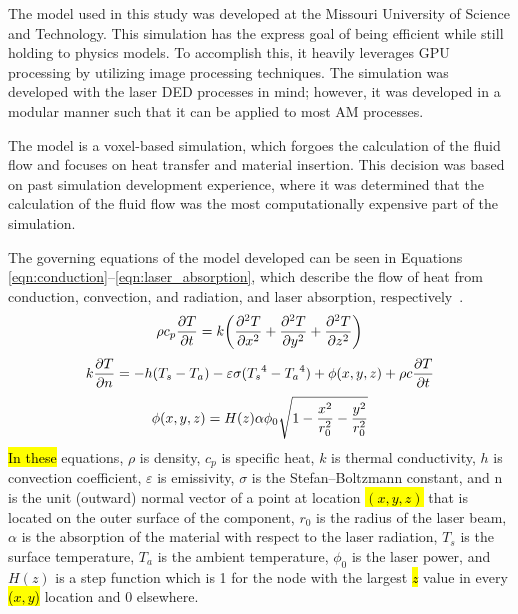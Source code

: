 \documentclass[metals,article,accept,pdftex,moreauthors]{Definitions/mdpi}
\begin{document}
The model used in this study was developed at the Missouri University of Science and 
Technology.
This simulation has the express goal of being efficient while still holding to physics 
models.  To accomplish this, it heavily leverages GPU processing by utilizing image 
processing techniques.  The simulation was developed with the laser \ac{DED} processes 
in mind; however, it was developed in a modular manner such that it can be applied to 
most \ac{AM} processes. 

The model is a voxel-based simulation, which forgoes the calculation of the fluid flow and focuses on heat transfer and material insertion.  This decision was based on past simulation development experience, where it was determined that the calculation of the fluid flow was the most computationally expensive part of the simulation.   

The governing equations of the model developed can be seen in Equations 
\eqref{eqn:conduction}--\eqref{eqn:laser_absorption}, which describe the flow of heat 
from conduction, convection, and radiation, and laser absorption, 
respectively~\cite{Han2012}.
\begin{equation}
\label{eqn:conduction}
\centering
\rho c_p \frac{\partial T}{\partial t}=k \left(\frac{\partial^2 T}{\partial x^2} +\frac{\partial^2 T}{\partial y^2}+\frac{\partial^2 T}{\partial z^2} \right)
\end{equation}
	\begin{equation}
	\label{eqn:conv-rad}
	\centering
	k \frac{\partial T}{\partial n}=-h (T_s-T_a) - \varepsilon \sigma ({T_s}^4-{T_a}^4) + \phi(x, y, z) + \rho c \frac{\partial T}{\partial t}
	\end{equation}
		\begin{equation}
		\label{eqn:laser_absorption}
		\centering
		\phi(x,y,z) = H(z) \alpha \phi_0 \sqrt{1-\frac{x^2}{r_0^2} -\frac{y^2}{r_0^2}}
		\end{equation}
\hl{In these} %
equations, $\rho$ is density, $c_p$ is specific heat, $k$ is thermal conductivity, $h$ is 
 convection coefficient, $\varepsilon$ is emissivity, $\sigma$ is the Stefan--Boltzmann 
 constant, and n is the unit (outward) normal vector of a point at location \hl{$(x, y, 
 z)$}%
 that is located on the outer surface of the component, $r_0$ is the radius of the laser beam, $\alpha$ is the absorption of the material with respect to the laser radiation, $T_s$ is the surface temperature,
 $T_a$ is the ambient temperature, $\phi_0$ is the laser power, and $H(z)$ is a step function which is 1 for the node with the largest \hl{$z$} value in every \hl{($x, y$)} location and 0 elsewhere.
\end{document}
